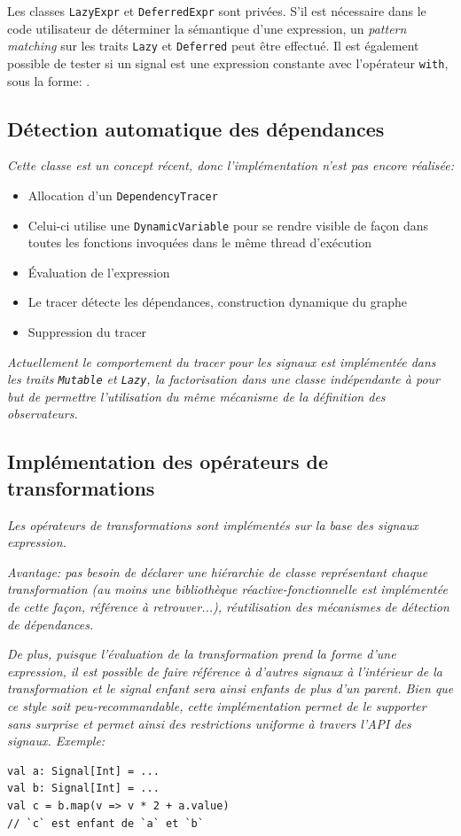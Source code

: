 Les classes \texttt{LazyExpr} et \texttt{DeferredExpr} sont privées. S'il est nécessaire dans le code utilisateur de déterminer la sémantique d'une expression, un \emph{pattern matching} sur les traits \texttt{Lazy} et \texttt{Deferred} peut être effectué. Il est également possible de tester si un signal est une expression constante avec l'opérateur \texttt{with}, sous la forme: .

\subsection{Détection automatique des dépendances}
\textit{Cette classe est un concept récent, donc l'implémentation n'est pas encore réalisée:}
{\itshape \begin{itemize}
	\item Allocation d'un \texttt{DependencyTracer}
	\item Celui-ci utilise une \texttt{DynamicVariable} pour se rendre visible de façon dans toutes les fonctions invoquées dans le même thread d'exécution
	\item Évaluation de l'expression
	\item Le tracer détecte les dépendances, construction dynamique du graphe
	\item Suppression du tracer
\end{itemize}}
\textit{Actuellement le comportement du tracer pour les signaux est implémentée dans les traits \texttt{Mutable} et \texttt{Lazy}, la factorisation dans une classe indépendante à pour but de permettre l'utilisation du même mécanisme de la définition des observateurs.}

\subsection{Implémentation des opérateurs de transformations}
\textit{Les opérateurs de transformations sont implémentés sur la base des signaux expression.}

\textit{Avantage: pas besoin de déclarer une hiérarchie de classe représentant chaque transformation (au moins une bibliothèque réactive-fonctionnelle est implémentée de cette façon, référence à retrouver...), réutilisation des mécanismes de détection de dépendances.}

\textit{De plus, puisque l'évaluation de la transformation prend la forme d'une expression, il est possible de faire référence à d'autres signaux à l'intérieur de la transformation et le signal enfant sera ainsi enfants de plus d'un parent. Bien que ce style soit peu-recommandable, cette implémentation permet de le supporter sans surprise et permet ainsi des restrictions uniforme à travers l'API des signaux. Exemple:}
\begin{lstlisting}
val a: Signal[Int] = ...
val b: Signal[Int] = ...
val c = b.map(v => v * 2 + a.value)
// `c` est enfant de `a` et `b`
\end{lstlisting}

